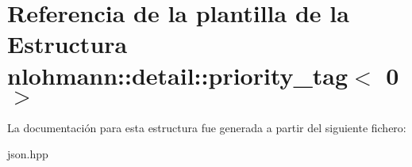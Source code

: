\hypertarget{structnlohmann_1_1detail_1_1priority__tag_3_010_01_4}{}\section{Referencia de la plantilla de la Estructura nlohmann\+:\+:detail\+:\+:priority\+\_\+tag$<$ 0 $>$}
\label{structnlohmann_1_1detail_1_1priority__tag_3_010_01_4}


La documentación para esta estructura fue generada a partir del siguiente fichero\+:\begin{DoxyCompactItemize}
\item 
json.\+hpp\end{DoxyCompactItemize}
